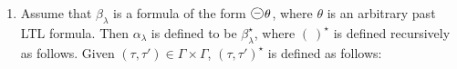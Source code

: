 \documentclass{LMCS}
\newcommand{\e}{\varepsilon}
\newcommand{\dm}{\Diamond}
\newcommand{\C}{{\mathcal{C}}}
\newcommand{\R}{{\mathcal{R}}}
\newcommand{\next}{\text{\raisebox{1pt}{$\bigcirc$}}}
\theoremstyle{plain}
\theoremstyle{definition}
\newcommand{\prev}{{\text{\Large $\mathbf{\circleddash}$}}}
\newcommand{\pret}{\tt{pret}}
\newcommand{\rett}{{\tt ret}}
\newcommand{\call}{{\tt call}}
\newcommand{\dmminus}{\dm^-}
\renewcommand{\dm}{\next}
\renewcommand{\dmminus}{\prev}
\begin{document}
{\begin{enumerate}[$\bullet$]
\begin{enumerate}[(1)]
\begin{enumerate}[(a)]
\item
  $(\neg \rett \wedge
    \dmminus_c \top \wedge \dmminus (\neg \call 
\wedge \C \xi_\tau) \wedge \R \xi_{\tau'})$;

\item $\bigvee_{\{a \mid
\tau = \tau_a\}} 
(\neg \rett \wedge
    \dmminus_c \top \wedge \dmminus (\call 
\wedge a) \wedge \R \xi_{\tau'})$; 

\item
    $(\neg \rett \wedge \neg \dmminus_c \top \wedge \dmminus \C
    \xi_\tau \wedge \R \xi_{\tau'})$; 

\item $(\pret \wedge \dmminus
    \C \xi_\tau \wedge \R \xi_{\tau'})$; 

\item $\bigvee_{\{a \mid
    \tau' = \tau_a\}} (\rett \wedge \neg \pret \wedge a \wedge
    \dmminus (\neg \call \wedge \C \xi_{\tau}))$; 

\item
    $\bigvee_{\{(a,b) \mid \tau = \tau_a, \tau'=\tau_b\}} (\rett
    \wedge \neg \pret \wedge b \wedge \dmminus (\call \wedge a))$.
    
\end{enumerate} 

\item if $\tau' = \tau_\e$ then
    $(\tau,\tau')^\circ$ is simply $\neg \top$; and 

\item if $\tau =
    \tau_\e$ and $\tau' \neq \tau_\e$, then $(\tau,\tau')^\circ$ is
    defined as $\neg \dmminus \top \wedge \R \xi_{\tau'}$.
    \end{enumerate}

Furthermore, if $\psi$ and $\varphi$ are
LTL formulas without temporal modalities, then \begin{eqnarray*} (\neg
\varphi)^\circ &:=& \neg \varphi^\circ,\\ (\varphi \vee \psi)^\circ
&:=& \varphi^\circ \vee \psi^\circ.  \end{eqnarray*}

\item Assume that $\beta_\lambda$ is a formula of the form $\dmminus
\theta$, where $\theta$ is an arbitrary past LTL formula. Then
$\alpha_\lambda$ is defined to be $\beta_\lambda^\star$, where $(\
)^\star$ is defined recursively as follows. Given $(\tau, \tau') \in
\Gamma \times \Gamma$, $(\tau, \tau')^\star$ is defined as 
follows: 

\begin{enumerate}[(1)] 


\end{enumerate}
\end{enumerate}}
\end{document}
